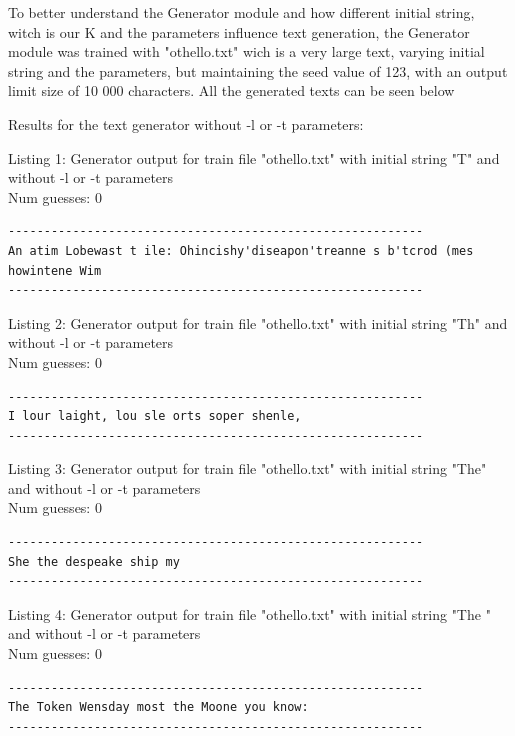 \documentclass{article}
\begin{document}
To better understand the Generator module and how different initial string, witch is our K and the parameters influence
text generation, the Generator module was trained with "othello.txt" wich is a very large text, varying initial string and the parameters, but
maintaining the seed value of 123, with an output limit size of 10 000 characters.
All the generated texts can be seen below

Results for the text generator without -l or -t parameters:

\hfill

Listing 1: Generator output for train file "othello.txt" with initial string "T" and without -l or -t parameters
\\Num guesses: 0

\begin{lstlisting}
----------------------------------------------------------
An atim Lobewast t ile: Ohincishy'diseapon'treanne s b'tcrod (mes howintene Wim
----------------------------------------------------------
\end{lstlisting}

Listing 2: Generator output for train file "othello.txt" with initial string "Th" and without -l or -t parameters
\\Num guesses: 0

\begin{lstlisting}
----------------------------------------------------------
I lour laight, lou sle orts soper shenle,
----------------------------------------------------------
\end{lstlisting}

Listing 3: Generator output for train file "othello.txt" with initial string "The" and without -l or -t parameters
\\Num guesses: 0

\begin{lstlisting}
----------------------------------------------------------
She the despeake ship my
----------------------------------------------------------
\end{lstlisting}

Listing 4: Generator output for train file "othello.txt" with initial string "The " and without -l or -t parameters
\\Num guesses: 0

\begin{lstlisting}
----------------------------------------------------------
The Token Wensday most the Moone you know:
----------------------------------------------------------
\end{lstlisting}
\end{document}
